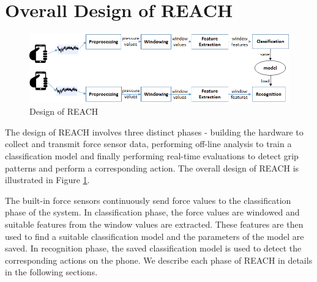\section{Overall Design of REACH}

\begin{figure}[h]
\includegraphics[width=.45\textwidth]{Block_Design.png}
\caption{Design of REACH}
\label{fig:Design of REACH}
\end{figure}

The design of REACH involves three distinct phases - building the hardware to collect and transmit force sensor data, performing off-line analysis to train a classification model and finally performing real-time evaluations to detect grip patterns and perform a corresponding action. The overall design of REACH is illustrated in Figure \ref{fig:Design of REACH}.
\par
The built-in force sensors continuously send force values to the classification phase of the system. In classification phase, the force values are windowed and suitable features from the window values are extracted. These features are then used to find a suitable classification model and the parameters of the model are saved. In recognition phase, the saved classification model is used to detect the corresponding actions on the phone. We describe each phase of REACH in details in the following sections.

